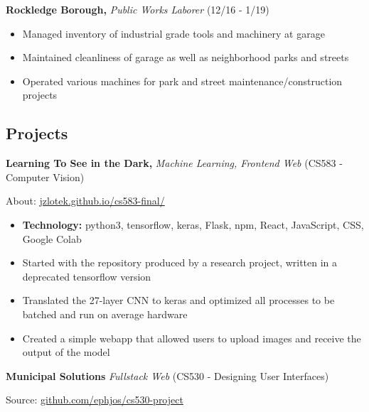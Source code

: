 \documentclass[10pt]{article}
\begin{document}
\vspace{-0.5em}
\textbf{Rockledge Borough,}
\emph{Public Works Laborer}
(12/16 - 1/19)

\vspace{-\topsep}
\begin{itemize}
    \setlength\itemsep{-0.5em}
    \item Managed inventory of industrial grade tools and machinery
        at garage
    \item Maintained cleanliness of garage as well as neighborhood
        parks and streets
    \item Operated various machines for park and street
        maintenance/construction projects
\end{itemize}

\vspace{-2em}
\subsection*{Projects}%
\label{sub:Projects}

\vspace{-0.5em}
\textbf{Learning To See in the Dark,}
\emph{Machine Learning, Frontend Web}
(CS583 - Computer Vision)

\indent \indent About:
\href{https://jzlotek.github.io/cs583-final/}
{jzlotek.github.io/cs583-final/}

\vspace{-\topsep}
\begin{itemize}
    \setlength\itemsep{-0.5em}
    \item \textbf{Technology:} python3, tensorflow, keras, Flask, npm,
        React, JavaScript, CSS, Google Colab
    \item Started with the repository produced by a research project,
        written in a deprecated tensorflow version
    \item Translated the 27-layer CNN to keras and optimized all processes
        to be batched and run on average hardware
    \item Created a simple webapp that allowed users to upload images and
        receive the output of the model
\end{itemize}

\vspace{-0.75em}
\textbf{Municipal Solutions}
\emph{Fullstack Web}
(CS530 - Designing User Interfaces)

\indent \indent Source:
\href{https://github.com/ephjos/cs530-project}
{github.com/ephjos/cs530-project}
\end{document}
